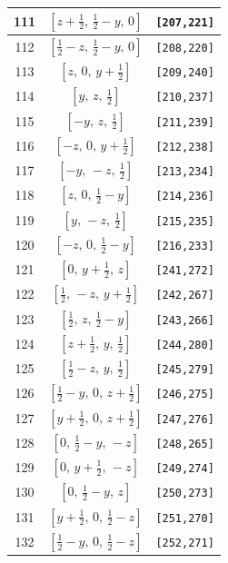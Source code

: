 \documentclass[fleqn,8pt]{jsarticle}
\begin{document}
\begin{longtable}{ccc}
111 & $\left[ z + \frac{1}{2},\, \frac{1}{2} - y,\, 0 \right]$ & {\tt [207,221]} \\ \hline
112 & $\left[ \frac{1}{2} - z,\, \frac{1}{2} - y,\, 0 \right]$ & {\tt [208,220]} \\ \hline
113 & $\left[ z,\, 0,\, y + \frac{1}{2} \right]$ & {\tt [209,240]} \\ \hline
114 & $\left[ y,\, z,\, \frac{1}{2} \right]$ & {\tt [210,237]} \\ \hline
115 & $\left[ - y,\, z,\, \frac{1}{2} \right]$ & {\tt [211,239]} \\ \hline
116 & $\left[ - z,\, 0,\, y + \frac{1}{2} \right]$ & {\tt [212,238]} \\ \hline
117 & $\left[ - y,\, - z,\, \frac{1}{2} \right]$ & {\tt [213,234]} \\ \hline
118 & $\left[ z,\, 0,\, \frac{1}{2} - y \right]$ & {\tt [214,236]} \\ \hline
119 & $\left[ y,\, - z,\, \frac{1}{2} \right]$ & {\tt [215,235]} \\ \hline
120 & $\left[ - z,\, 0,\, \frac{1}{2} - y \right]$ & {\tt [216,233]} \\ \hline
121 & $\left[ 0,\, y + \frac{1}{2},\, z \right]$ & {\tt [241,272]} \\ \hline
122 & $\left[ \frac{1}{2},\, - z,\, y + \frac{1}{2} \right]$ & {\tt [242,267]} \\ \hline
123 & $\left[ \frac{1}{2},\, z,\, \frac{1}{2} - y \right]$ & {\tt [243,266]} \\ \hline
124 & $\left[ z + \frac{1}{2},\, y,\, \frac{1}{2} \right]$ & {\tt [244,280]} \\ \hline
125 & $\left[ \frac{1}{2} - z,\, y,\, \frac{1}{2} \right]$ & {\tt [245,279]} \\ \hline
126 & $\left[ \frac{1}{2} - y,\, 0,\, z + \frac{1}{2} \right]$ & {\tt [246,275]} \\ \hline
127 & $\left[ y + \frac{1}{2},\, 0,\, z + \frac{1}{2} \right]$ & {\tt [247,276]} \\ \hline
128 & $\left[ 0,\, \frac{1}{2} - y,\, - z \right]$ & {\tt [248,265]} \\ \hline
129 & $\left[ 0,\, y + \frac{1}{2},\, - z \right]$ & {\tt [249,274]} \\ \hline
130 & $\left[ 0,\, \frac{1}{2} - y,\, z \right]$ & {\tt [250,273]} \\ \hline
131 & $\left[ y + \frac{1}{2},\, 0,\, \frac{1}{2} - z \right]$ & {\tt [251,270]} \\ \hline
132 & $\left[ \frac{1}{2} - y,\, 0,\, \frac{1}{2} - z \right]$ & {\tt [252,271]} \\ \hline

\end{longtable}
\end{document}
